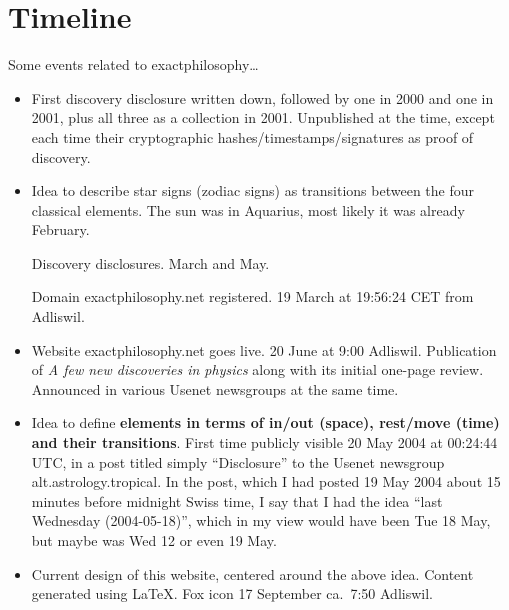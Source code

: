 



\avantgarde

\section{Timeline}

Some events related to exactphilosophy…

\small
\begin{itemize}

\item[1998]
First discovery disclosure written down,
followed by one in 2000 and one in 2001,
plus all three as a collection in 2001.
%
Unpublished at the time,
except each time their cryptographic
hashes\hspace{0.1em}/\hspace{0.1em}timestamps\hspace{0.1em}/\hspace{0.1em}signatures
as proof of discovery.

\item[2001]
Idea to describe star signs (zodiac signs)
as transitions between the four classical elements.
%
The sun was in Aquarius, most likely it was already February.

Discovery disclosures. March and May.

Domain exactphilosophy.net registered.
%
19 March at 19:56:24 CET from Adliswil.

\item[2002]
Website exactphilosophy.net goes live.
%
20 June at 9:00 Adliswil.
%
Publication of \textsl{A few new discoveries in physics}
along with its initial one-page review.
%
Announced in various Usenet newsgroups at the same time.

\item[2004]
Idea to define \textbf{\color{xphi}elements in terms of in/out (space), rest/move (time) and their transitions}.
%
First time publicly visible 20 May 2004 at 00:24:44 UTC,
in a post titled simply “Disclosure”
to the Usenet newsgroup alt.astrology.tropical.
In the post,
which I had posted 19 May 2004
about 15 minutes before midnight Swiss time,
I say that I had the idea “last Wednesday (2004-05-18)”,
which in my view would have been Tue 18 May,
but maybe was Wed 12 or even 19 May.

\item[2005]
Current design of this website, centered around the above idea.
%
Content generated using LaTeX.
%
Fox icon 17 September ca.\ 7:50 Adliswil.


\end{itemize}
